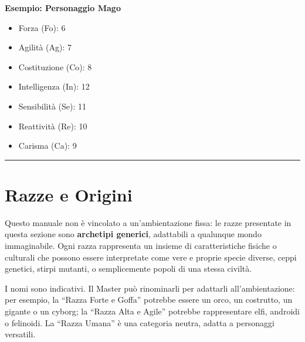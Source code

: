 \documentclass[../manuale_main.tex]{subfiles}
\begin{document}
\textbf{Esempio: Personaggio Mago}
\begin{itemize}
    \item Forza (Fo): 6
    \item Agilità (Ag): 7
    \item Costituzione (Co): 8
    \item Intelligenza (In): 12
    \item Sensibilità (Se): 11
    \item Reattività (Re): 10
    \item Carisma (Ca): 9
\end{itemize}

\vspace{0.5cm}
\noindent
\begin{center}
\rule{\textwidth}{0.4pt} 
\end{center}
\vspace{0.5cm}


\section{Razze e Origini}

\noindent
Questo manuale non è vincolato a un’ambientazione fissa: le razze presentate in questa sezione sono \textbf{archetipi generici}, adattabili a qualunque mondo immaginabile. Ogni razza rappresenta un insieme di caratteristiche fisiche o culturali che possono essere interpretate come vere e proprie specie diverse, ceppi genetici, stirpi mutanti, o semplicemente popoli di una stessa civiltà.

\medskip
\noindent
I nomi sono indicativi. Il Master può rinominarli per adattarli all’ambientazione: per esempio, la “Razza Forte e Goffa” potrebbe essere un orco, un costrutto, un gigante o un cyborg; la “Razza Alta e Agile” potrebbe rappresentare elfi, androidi o felinoidi. La “Razza Umana” è una categoria neutra, adatta a personaggi versatili.
\end{document}
